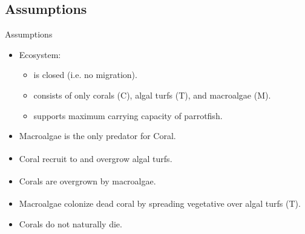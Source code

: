 \documentclass{beamer}
\begin{document}
\subsection{Assumptions}
\begin{frame}{Assumptions}
    \begin{itemize}
        \item Ecosystem:
        \begin{itemize}
            \item is closed (i.e. no migration).
            \item consists of only corals (C), algal turfs (T), and macroalgae (M).
            \item supports maximum carrying capacity of parrotfish.
        \end{itemize}
        \item Macroalgae is the only predator for Coral.
        \item Coral recruit to and overgrow algal turfs\textsuperscript{\cite{04_mathanalysis}}.
        \item Corals are overgrown by macroalgae\textsuperscript{\cite{04_mathanalysis}}.
        \item Macroalgae colonize dead coral by spreading vegetative over algal turfs (T)\textsuperscript{\cite{04_mathanalysis}}.
        \item Corals do not naturally die.
    \end{itemize}
\end{frame}
\end{document}
